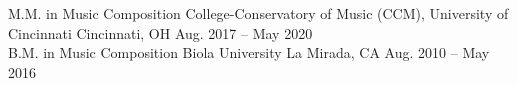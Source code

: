 
\begin{cventries}

  \cventry
  {M.M. in Music Composition} %
  {College-Conservatory of Music (CCM), University of Cincinnati} %
  {Cincinnati, OH} %
  {Aug. 2017 -- May 2020} %
  {
  } \\

  \cventry
  {B.M. in Music Composition} %
  {Biola University} %
  {La Mirada, CA} %
  {Aug. 2010 -- May 2016} %
  {
  } \\

\end{cventries}
